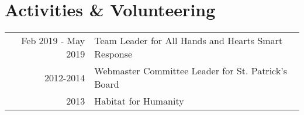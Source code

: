 \documentclass[]{resume}
\begin{document}
\begin{minipage}[t]{0.66\textwidth}



\section{Activities \& Volunteering}
\begin{tabular}{rl}
Feb 2019 - May 2019 & Team Leader for All Hands and Hearts Smart Response \\
2012-2014 & Webmaster Committee Leader for St. Patrick's Board \\
2013 & Habitat for Humanity \\
\end{tabular}
\sectionsep

\end{minipage}
\end{document}
